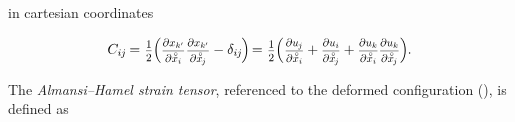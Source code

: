 \noindent
in cartesian coordinates

\nopagebreak\begin{equation*}
\displaystyle C_{i\hspace{-0.1ex}j} \hspace{-0.2ex}
= \hspace{.1ex} \smalldisplaystyleonehalf \hspace{-0.1ex} \Bigl(
     \scalebox{.8}{$ \displaystyle \frac{\partial x_{k'}}{\partial \mathcircabove{x}_{i}} $} \hspace{.1ex}
     \scalebox{.8}{$ \displaystyle \frac{\partial x_{k'}}{\partial \mathcircabove{x}_{\hspace{-0.2ex}j}} $}
     - \delta_{i\hspace{-0.1ex}j} \hspace{-0.2ex}
\Bigr) \hspace{-0.3ex}
= \hspace{.1ex} \smalldisplaystyleonehalf \hspace{-0.1ex} \Bigl( \hspace{.1ex}
     \scalebox{.8}{$ \displaystyle \frac{\partial u_{\hspace{-0.1ex}j}}{\partial \mathcircabove{x}_{i}} $}
     + \scalebox{.8}{$ \displaystyle \frac{\partial u_{i}}{\partial \mathcircabove{x}_{\hspace{-0.2ex}j}} $}
     + \scalebox{.8}{$ \displaystyle \frac{\partial u_{k}}{\partial \mathcircabove{x}_{i}} \frac{\partial u_{k}}{\partial \mathcircabove{x}_{\hspace{-0.2ex}j}} $}
\Bigr)
\hspace{-0.1ex} .
\end{equation*}

The \emph{Almansi\hbox{--}Hamel strain tensor}, referenced to the deformed configuration (), is defined as

